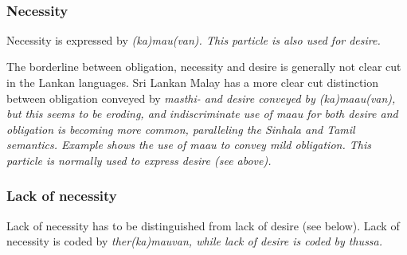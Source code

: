  \\

\subsubsection{Necessity}\label{sec:func:Necessity}
Necessity is expressed by \em (ka)mau(van)\em. This particle is also used for desire.



The borderline between obligation, necessity and desire is generally not clear cut in the Lankan languages. Sri Lankan Malay has a more clear cut distinction between obligation conveyed by \em masthi- \em and desire conveyed by \em (ka)maau(van)\em, but this seems to be eroding, and indiscriminate use of \em maau \em for both desire and obligation is becoming more common, paralleling the Sinhala and Tamil semantics. Example  shows the use of \em maau \em to convey mild obligation. This particle is normally used to express desire (see above).


\subsubsection{Lack of necessity}\label{sec:func:Lackofnecessity}
Lack of necessity has to be distinguished from lack of desire (see below). Lack of necessity is coded by \em ther(ka)mauvan\em, while lack of desire is coded by \em thussa\em.

